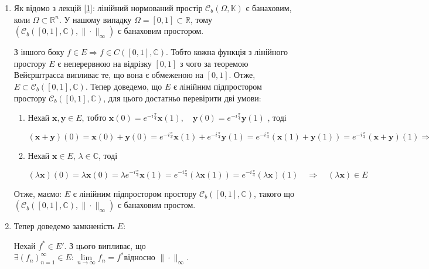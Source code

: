 \documentclass[a5paper, 20pt, titlepage]{article}
\newcommand{\x}{\textbf{x}}
\newcommand{\y}{\textbf{y}}
\begin{document}
\begin{enumerate}
\item Як відомо з лекцій \hyperlink{1}{[1]}: лінійний нормований простір $\mathcal{C}_b \left( \Omega, \mathbb{K} \right)$ є банаховим, коли $\Omega \subset \mathbb{R}^n$. У нашому випадку $\Omega = [0, 1] \subset \mathbb{R}$, тому $\left( \mathcal{C}_b  \left( [0, 1], \mathbb{C} \right), \| \cdot \|_\infty \right)$ є банаховим простором.

З іншого боку $f \in E \Rightarrow{} f \in C([0,1], \mathbb{C})$. Тобто кожна функція з лінійного простору $E$ є неперервною на відрізку $[0, 1]$ з чого за теоремою Вейєрштрасса випливає те, що вона є обмеженою на $[0, 1]$. Отже, $E \subset \mathcal{C}_b  \left( [0, 1], \mathbb{C} \right)$. Тепер доведемо, що $E$ є лінійним підпростором простору $\mathcal{C}_b  \left( [0, 1], \mathbb{C} \right)$, для цього достатньо перевірити дві умови:

\begin{enumerate}
\item Нехай $\textbf{x}, \textbf{y} \in E$, тобто  $\textbf{x}(0) = e^{-i \frac{\pi}{4}} \textbf{x}(1), \quad \textbf{y}(0) = e^{-i \frac{\pi}{4}} \textbf{y}(1)$ , тоді

\vspace{3mm}

$(\x + \y)(0) = \x(0) + \y(0) = e^{-i \frac{\pi}{4}} \x(1) +  e^{-i \frac{\pi}{4}} \y(1) =  e^{-i \frac{\pi}{4}}(\x(1) + \y(1)) =  e^{-i \frac{\pi}{4}}(\x + \y)(1) 
\Rightarrow{} \quad \x + \y \in E$

\vspace{4mm}
\item Нехай $\x \in E$, $\lambda \in \mathbb{C}$, тоді

\vspace{3mm}
 
$(\lambda \x)(0) = \lambda \x(0) = \lambda  e^{-i \frac{\pi}{4}} \x(1) = e^{-i \frac{\pi}{4}} (\lambda \x(1)) = e^{-i \frac{\pi}{4}} (\lambda \x)(1) \quad \Rightarrow \quad (\lambda \x) \in E $
\end{enumerate}

Отже, маємо: $E$ є лінійним підпростором простору $\mathcal{C}_b  \left( [0, 1], \mathbb{C} \right)$, такого що $\left( \mathcal{C}_b  \left( [0, 1], \mathbb{C} \right), \| \cdot \|_\infty \right)$ є банаховим простом.
 

\item Тепер доведемо замкненість $E$:

Нехай $f^* \in E'$. З цього випливає, що $\exists \left( f_n\right)_{n = 1}^{\infty} \in E: \lim \limits_{n \to \infty} f_n = f^* \text{відносно $\| \cdot \|_\infty$}$.


\end{enumerate}
\end{document}
